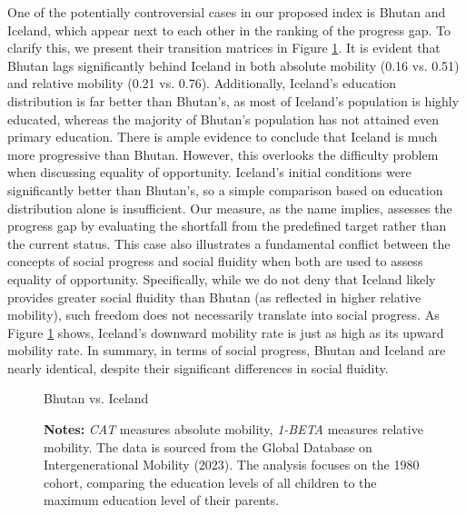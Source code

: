 One of the potentially controversial cases in our proposed index is Bhutan and Iceland, which appear next to each other in the ranking of the progress gap. To clarify this, we present their transition matrices in Figure \ref{fig:compare3}. It is evident that Bhutan lags significantly behind Iceland in both absolute mobility (0.16 vs. 0.51) and relative mobility (0.21 vs. 0.76). Additionally, Iceland's education distribution is far better than Bhutan’s, as most of Iceland’s population is highly educated, whereas the majority of Bhutan’s population has not attained even primary education. There is ample evidence to conclude that Iceland is much more progressive than Bhutan. However, this overlooks the difficulty problem when discussing equality of opportunity. Iceland’s initial conditions were significantly better than Bhutan’s, so a simple comparison based on education distribution alone is insufficient. Our measure, as the name implies, assesses the progress gap by evaluating the shortfall from the predefined target rather than the current status.  This case also illustrates a fundamental conflict between the concepts of social progress and social fluidity when both are used to assess equality of opportunity. Specifically, while we do not deny that Iceland likely provides greater social fluidity than Bhutan (as reflected in higher relative mobility), such freedom does not necessarily translate into social progress. As Figure \ref{fig:compare3} shows, Iceland’s downward mobility rate is just as high as its upward mobility rate. In summary, in terms of social progress, Bhutan and Iceland are nearly identical, despite their significant differences in social fluidity.


\begin{figure}[H]
    \centering
    \scalebox{0.55}{}
    \caption{Bhutan vs. Iceland}
    \label{fig:compare3}
    \captionsetup{font=footnotesize}
    \caption*{\textbf{Notes:} \textit{CAT} measures absolute mobility, \textit{1-BETA} measures relative mobility. The data is sourced from the Global Database on Intergenerational Mobility (2023). The analysis focuses on the 1980 cohort, comparing the education levels of all children to the maximum education level of their parents.}
\end{figure}

